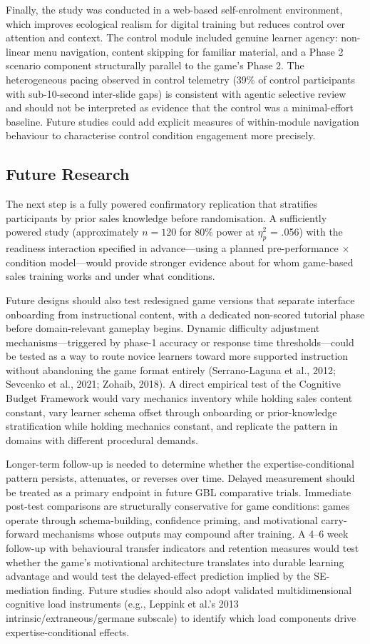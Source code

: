 \documentclass[12pt]{report}
\begin{document}
Finally, the study was conducted in a web-based self-enrolment environment, which improves ecological realism for digital training but reduces control over attention and context. The control module included genuine learner agency: non-linear menu navigation, content skipping for familiar material, and a Phase 2 scenario component structurally parallel to the game's Phase 2. The heterogeneous pacing observed in control telemetry (39\% of control participants with sub-10-second inter-slide gaps) is consistent with agentic selective review and should not be interpreted as evidence that the control was a minimal-effort baseline. Future studies could add explicit measures of within-module navigation behaviour to characterise control condition engagement more precisely.

\subsection{Future Research}
The next step is a fully powered confirmatory replication that stratifies participants by prior sales knowledge before randomisation. A sufficiently powered study (approximately $n = 120$ for 80\% power at $\eta^2_p$ = .056) with the readiness interaction specified in advance---using a planned pre-performance $\times$ condition model---would provide stronger evidence about for whom game-based sales training works and under what conditions.

Future designs should also test redesigned game versions that separate interface onboarding from instructional content, with a dedicated non-scored tutorial phase before domain-relevant gameplay begins. Dynamic difficulty adjustment mechanisms---triggered by phase-1 accuracy or response time thresholds---could be tested as a way to route novice learners toward more supported instruction without abandoning the game format entirely (Serrano-Laguna et al., 2012; Sevcenko et al., 2021; Zohaib, 2018). A direct empirical test of the Cognitive Budget Framework would vary mechanics inventory while holding sales content constant, vary learner schema offset through onboarding or prior-knowledge stratification while holding mechanics constant, and replicate the pattern in domains with different procedural demands.

Longer-term follow-up is needed to determine whether the expertise-conditional pattern persists, attenuates, or reverses over time. Delayed measurement should be treated as a primary endpoint in future GBL comparative trials. Immediate post-test comparisons are structurally conservative for game conditions: games operate through schema-building, confidence priming, and motivational carry-forward mechanisms whose outputs may compound after training. A 4--6 week follow-up with behavioural transfer indicators and retention measures would test whether the game's motivational architecture translates into durable learning advantage and would test the delayed-effect prediction implied by the SE-mediation finding. Future studies should also adopt validated multidimensional cognitive load instruments (e.g., Leppink et al.'s 2013 intrinsic/extraneous/germane subscale) to identify which load components drive expertise-conditional effects.
\end{document}
